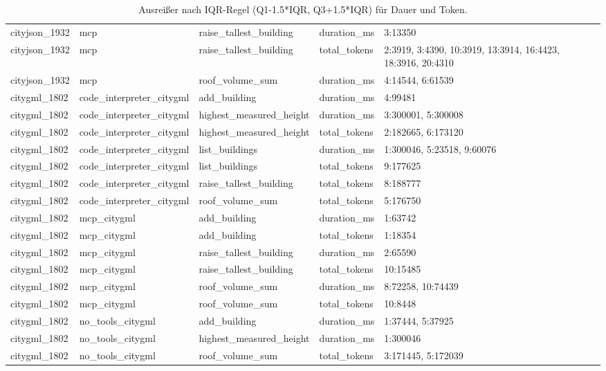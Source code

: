 \begin{table}[H]
\begin{tabular}{l l l l l}
cityjson\_1932 & mcp & raise\_tallest\_building & duration\_ms & 3:13350 \\
cityjson\_1932 & mcp & raise\_tallest\_building & total\_tokens & 2:3919, 3:4390, 10:3919, 13:3914, 16:4423, 18:3916, 20:4310 \\
cityjson\_1932 & mcp & roof\_volume\_sum & duration\_ms & 4:14544, 6:61539 \\
citygml\_1802 & code\_interpreter\_citygml & add\_building & duration\_ms & 4:99481 \\
citygml\_1802 & code\_interpreter\_citygml & highest\_measured\_height & duration\_ms & 3:300001, 5:300008 \\
citygml\_1802 & code\_interpreter\_citygml & highest\_measured\_height & total\_tokens & 2:182665, 6:173120 \\
citygml\_1802 & code\_interpreter\_citygml & list\_buildings & duration\_ms & 1:300046, 5:23518, 9:60076 \\
citygml\_1802 & code\_interpreter\_citygml & list\_buildings & total\_tokens & 9:177625 \\
citygml\_1802 & code\_interpreter\_citygml & raise\_tallest\_building & total\_tokens & 8:188777 \\
citygml\_1802 & code\_interpreter\_citygml & roof\_volume\_sum & total\_tokens & 5:176750 \\
citygml\_1802 & mcp\_citygml & add\_building & duration\_ms & 1:63742 \\
citygml\_1802 & mcp\_citygml & add\_building & total\_tokens & 1:18354 \\
citygml\_1802 & mcp\_citygml & raise\_tallest\_building & duration\_ms & 2:65590 \\
citygml\_1802 & mcp\_citygml & raise\_tallest\_building & total\_tokens & 10:15485 \\
citygml\_1802 & mcp\_citygml & roof\_volume\_sum & duration\_ms & 8:72258, 10:74439 \\
citygml\_1802 & mcp\_citygml & roof\_volume\_sum & total\_tokens & 10:8448 \\
citygml\_1802 & no\_tools\_citygml & add\_building & duration\_ms & 1:37444, 5:37925 \\
citygml\_1802 & no\_tools\_citygml & highest\_measured\_height & duration\_ms & 1:300046 \\
citygml\_1802 & no\_tools\_citygml & roof\_volume\_sum & total\_tokens & 3:171445, 5:172039 \\
\bottomrule
\end{tabular}
\caption{Ausreißer nach IQR-Regel (Q1-1.5*IQR, Q3+1.5*IQR) für Dauer und Token.}
\end{table}